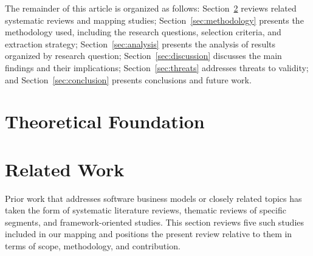 \documentclass[journal]{IEEEtran}
\begin{document}
The remainder of this article is organized as follows: Section~\ref{sec:related-work} reviews related systematic reviews and mapping studies; Section~\ref{sec:methodology} presents the methodology used, including the research questions, selection criteria, and extraction strategy; Section~\ref{sec:analysis} presents the analysis of results organized by research question; Section~\ref{sec:discussion} discusses the main findings and their implications; Section~\ref{sec:threats} addresses threats to validity; and Section~\ref{sec:conclusion} presents conclusions and future work.






\section{Theoretical Foundation}





\section{Related Work}\label{sec:related-work}

Prior work that addresses software business models or closely related topics has taken the form of systematic literature reviews, thematic reviews of specific segments, and framework-oriented studies. This section reviews five such studies included in our mapping and positions the present review relative to them in terms of scope, methodology, and contribution.
\end{document}
